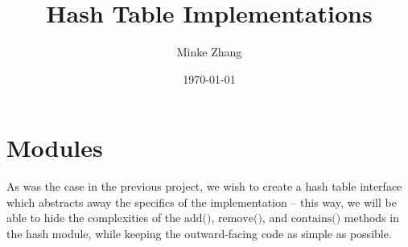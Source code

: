 \documentclass{article}
\newcommand{\tb}[1]{\textbf{#1}}
\newcommand{\cpart}[1]{\newblock{\LARGE {\\\\#1}}}
\newcommand{\code}[1]{\texttt{$\text{#1}$}}
\begin{document}

\title{\tb{Hash Table Implementations}}
\author{Minke Zhang\hspace*{-\tabcolsep}}
\date{\today}

\begingroup
\let\center\flushright
\let\endcenter\endflushright
\maketitle
\endgroup

\section{Modules}

\cpart{Hash Tables}

As was the case in the previous project, we wish to create a hash table interface which abstracts away the specifics of the implementation -- this way, we will be 
able to hide the complexities of the \code{add()}, \code{remove()}, and \code{contains()} methods in the hash module, while keeping the outward-facing code as 
simple as possible.
\end{document}
